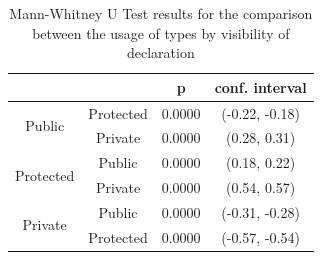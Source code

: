 \documentclass[preprint]{sigplanconf}
\renewcommand{\arraystretch}{1.2}
\begin{document}
\begin{table}[h]

\centering{}%
\renewcommand{\arraystretch}{1.2}

\begin{tabular}{|c|c|c|c|}
\hline 
								& {}		& p		& conf. interval	\\
\hline
\hline
\multirow{2}{*}{Public}			& Protected	& 0.0000 & (-0.22, -0.18)	\\ 
								& Private	& 0.0000 &  (0.28, 0.31)	\\
\hline  
\multirow{2}{*}{Protected}		& Public	& 0.0000 & (0.18, 0.22)	\\
								& Private	& 0.0000 & (0.54, 0.57)	\\
\hline  
\multirow{2}{*}{Private}		& Public	& 0.0000 & (-0.31, -0.28)	\\
								& Protected	& 0.0000 & (-0.57, -0.54)	\\
\hline  
\end{tabular}
\caption{Mann-Whitney U Test results for the comparison between the usage of types by visibility of declaration}
\label{tab:all_utest_visibility}
\end{table}


% 
% 
% 
\end{document}
